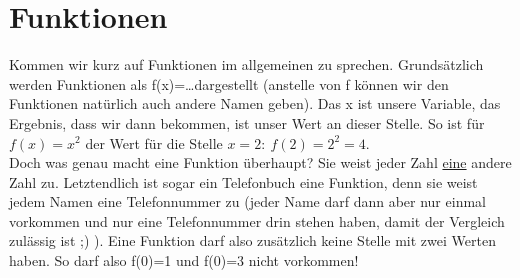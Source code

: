 \section{Funktionen}
Kommen wir kurz auf Funktionen im allgemeinen zu sprechen. Grundsätzlich werden Funktionen als f(x)=\ldots dargestellt (anstelle von f können wir den Funktionen natürlich auch andere Namen geben). Das x ist unsere Variable, das Ergebnis, dass wir dann bekommen, ist unser Wert an dieser Stelle. So ist für \(f(x)=x^2\) der Wert für die Stelle \(x=2:\ f(2)=2^2=4\).\\
Doch was genau macht eine Funktion überhaupt? Sie weist jeder Zahl \underline{eine} andere Zahl zu. Letztendlich ist sogar ein Telefonbuch eine Funktion, denn sie weist jedem Namen eine Telefonnummer zu (jeder Name darf dann aber nur einmal vorkommen und nur eine Telefonnummer drin stehen haben, damit der Vergleich zulässig ist ;) ). Eine Funktion darf also zusätzlich keine Stelle mit zwei Werten haben. So darf also f(0)=1 und f(0)=3 nicht vorkommen!






